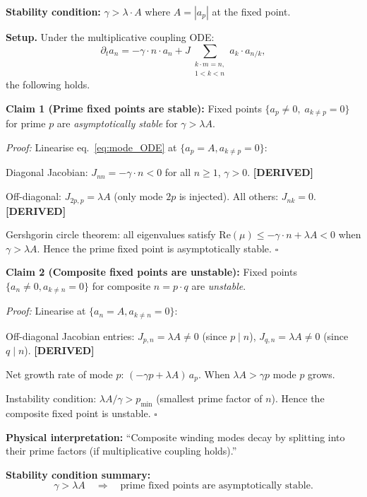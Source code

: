 \begin{tcolorbox}[colback=blue!5!white,colframe=blue!60!black,
  title=Theorem H.1 — Prime Attractor Stability \textmd{[DERIVED — conditional on multiplicative coupling]}]

\textbf{Stability condition:} $\gamma > \lambda \cdot A$ where $A = |a_p|$ at the fixed point.

\medskip
\noindent\textbf{Setup.}  Under the multiplicative coupling ODE:
\begin{equation}
\partial_t a_n = -\gamma\cdot n\cdot a_n
  + J\!\!\sum_{\substack{k\cdot m = n,\\ 1<k<n}}\!\! a_k \cdot a_{n/k},
  \label{eq:mode_ODE}
\end{equation}
the following holds.

\medskip
\noindent\textbf{Claim 1 (Prime fixed points are stable):}
Fixed points $\{a_p \neq 0,\; a_{k\neq p} = 0\}$ for prime $p$ are
\emph{asymptotically stable} for $\gamma > \lambda A$.

\medskip
\noindent\textit{Proof:} Linearise eq.~\eqref{eq:mode_ODE} at $\{a_p = A, a_{k\neq p}=0\}$:

\noindent Diagonal Jacobian:
$J_{nn} = -\gamma\cdot n < 0$ for all $n\geq 1$, $\gamma>0$. \textbf{[DERIVED]}

\noindent Off-diagonal: $J_{2p,p} = \lambda A$ (only mode $2p$ is injected).
All others: $J_{nk} = 0$. \textbf{[DERIVED]}

\noindent Gershgorin circle theorem: all eigenvalues satisfy
$\mathrm{Re}(\mu) \leq -\gamma\cdot n + \lambda A < 0$ when $\gamma > \lambda A$.
Hence the prime fixed point is asymptotically stable. $\square$

\medskip
\noindent\textbf{Claim 2 (Composite fixed points are unstable):}
Fixed points $\{a_n \neq 0, a_{k\neq n}=0\}$ for composite $n = p\cdot q$
are \emph{unstable}.

\medskip
\noindent\textit{Proof:} Linearise at $\{a_n = A, a_{k\neq n} = 0\}$:

\noindent Off-diagonal Jacobian entries:
$J_{p,n} = \lambda A \neq 0$ (since $p \mid n$),
$J_{q,n} = \lambda A \neq 0$ (since $q \mid n$). \textbf{[DERIVED]}

\noindent Net growth rate of mode $p$:
$(-\gamma p + \lambda A)\,a_p$. When $\lambda A > \gamma p$ mode $p$ grows.

\noindent Instability condition: $\lambda A/\gamma > p_{\min}$ (smallest prime factor of $n$).
Hence the composite fixed point is unstable. $\square$

\medskip
\noindent\textbf{Physical interpretation:}
``Composite winding modes decay by splitting into their prime factors (if multiplicative coupling holds).''

\medskip
\noindent\textbf{Stability condition summary:}
\begin{equation}
\gamma > \lambda A \quad \Rightarrow \quad \text{prime fixed points are asymptotically stable.}
  \label{eq:stability_condition}
\end{equation}

\end{tcolorbox}

